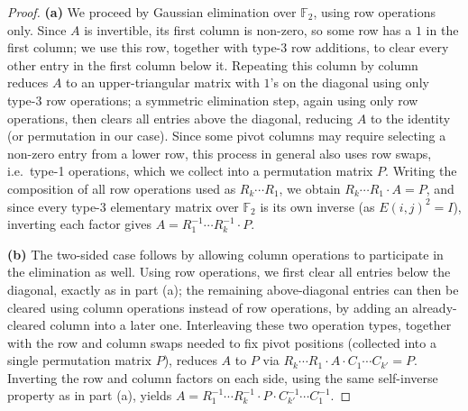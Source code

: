\begin{proof}
\textbf{(a)} We proceed by Gaussian elimination over $\mathbb{F}_2$, using
row operations only. Since $A$ is invertible, its first column is non-zero,
so some row has a $1$ in the first column; we use this row, together with
type-3 row additions, to clear every other entry in the first column below
it. Repeating this column by column reduces $A$ to an upper-triangular
matrix with $1$'s on the diagonal using only type-3 row operations; a
symmetric elimination step, again using only row operations, then clears
all entries above the diagonal, reducing $A$ to the identity (or permutation in our case). Since some
pivot columns may require selecting a non-zero entry from a lower row, this
process in general also uses row swaps, i.e.\ type-1 operations, which we
collect into a permutation matrix $P$. Writing the composition of all row
operations used as $R_k \cdots R_1$, we obtain $R_k \cdots R_1 \cdot A = P$,
and since every type-3 elementary matrix over $\mathbb{F}_2$ is its own
inverse (as $E(i, j)^2 = I$), inverting each factor gives
$A = R_1^{-1} \cdots R_k^{-1} \cdot P$.

\textbf{(b)} The two-sided case follows by allowing column operations to
participate in the elimination as well. Using row operations, we first
clear all entries below the diagonal, exactly as in part (a); the remaining
above-diagonal entries can then be cleared using column operations instead
of row operations, by adding an already-cleared column into a later one.
Interleaving these two operation types, together with the row and column
swaps needed to fix pivot positions (collected into a single permutation
matrix $P$), reduces $A$ to $P$ via
$R_{k} \cdots R_{1} \cdot A \cdot C_{1} \cdots C_{k'} = P$. Inverting the row
and column factors on each side, using the same self-inverse property as in
part (a), yields
$A = R_{1}^{-1} \cdots R_{k}^{-1} \cdot P \cdot C_{k'}^{-1} \cdots C_{1}^{-1}$.
\end{proof}


